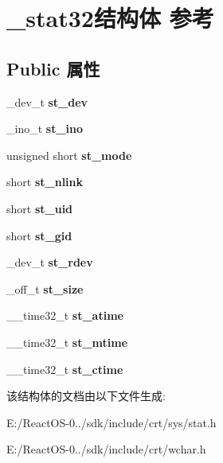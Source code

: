 \hypertarget{struct__stat32}{}\section{\+\_\+stat32结构体 参考}
\label{struct__stat32}
\subsection*{Public 属性}
\begin{DoxyCompactItemize}
\item 
\mbox{\label{struct__stat32_a53a171a0c99fe9e8be9a63a9b3272b7d}} 
\+\_\+dev\+\_\+t {\bfseries st\+\_\+dev}
\item 
\mbox{\label{struct__stat32_a9003f8e0c99d26edb2c7077bcbb45919}} 
\+\_\+ino\+\_\+t {\bfseries st\+\_\+ino}
\item 
\mbox{\label{struct__stat32_a324b7b2065f0386cfb85bc0fc198cf51}} 
unsigned short {\bfseries st\+\_\+mode}
\item 
\mbox{\label{struct__stat32_afc2140ee5d7ec62d7119f6a47d362e23}} 
short {\bfseries st\+\_\+nlink}
\item 
\mbox{\label{struct__stat32_a092636312c356935c27ce3398382d54b}} 
short {\bfseries st\+\_\+uid}
\item 
\mbox{\label{struct__stat32_a25f1fd3c968ca3f5fba0b094b834f4e6}} 
short {\bfseries st\+\_\+gid}
\item 
\mbox{\label{struct__stat32_a1fdd5e6ec16ccdc901a1063313f49650}} 
\+\_\+dev\+\_\+t {\bfseries st\+\_\+rdev}
\item 
\mbox{\label{struct__stat32_afe45981f460551eafa8efb575cff61ad}} 
\+\_\+off\+\_\+t {\bfseries st\+\_\+size}
\item 
\mbox{\label{struct__stat32_ad3f6d030393e8169e06ac14666ae6be2}} 
\+\_\+\+\_\+time32\+\_\+t {\bfseries st\+\_\+atime}
\item 
\mbox{\label{struct__stat32_a4193fcf57c7a577eb4601c692110e2ce}} 
\+\_\+\+\_\+time32\+\_\+t {\bfseries st\+\_\+mtime}
\item 
\mbox{\label{struct__stat32_a80b3de7fec71b03b23aeb63372dcf493}} 
\+\_\+\+\_\+time32\+\_\+t {\bfseries st\+\_\+ctime}
\end{DoxyCompactItemize}


该结构体的文档由以下文件生成\+:\begin{DoxyCompactItemize}
\item 
E\+:/\+React\+O\+S-\/0../sdk/include/crt/sys/stat.\+h\item 
E\+:/\+React\+O\+S-\/0../sdk/include/crt/wchar.\+h\end{DoxyCompactItemize}

